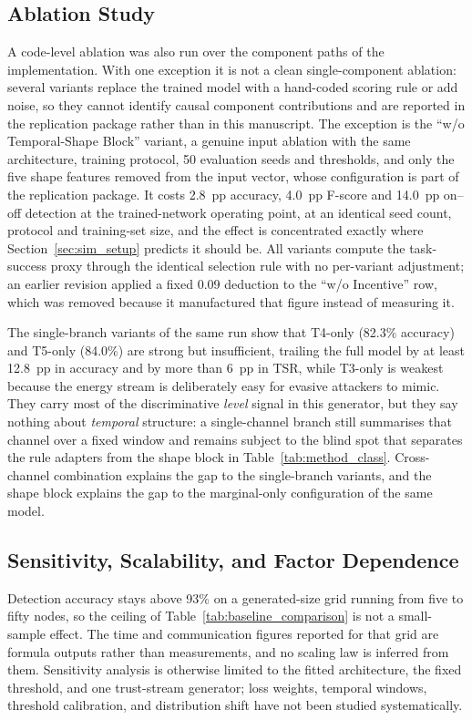 \documentclass[notspecified,article,submit,moreauthors]{Definitions/mdpi}
\begin{document}
\subsection{Ablation Study}
\label{sec:ablation}
A code-level ablation was also run over the component paths of the implementation. With one exception it is not a clean single-component ablation: several variants replace the trained model with a hand-coded scoring rule or add noise, so they cannot identify causal component contributions and are reported in the replication package rather than in this manuscript. The exception is the ``w/o Temporal-Shape Block'' variant, a genuine input ablation with the same architecture, training protocol, 50 evaluation seeds and thresholds, and only the five shape features removed from the input vector, whose configuration is part of the replication package. It costs 2.8~pp accuracy, 4.0~pp F-score and 14.0~pp on--off detection at the trained-network operating point, at an identical seed count, protocol and training-set size, and the effect is concentrated exactly where Section~\ref{sec:sim_setup} predicts it should be. All variants compute the task-success proxy through the identical selection rule with no per-variant adjustment; an earlier revision applied a fixed 0.09 deduction to the ``w/o Incentive'' row, which was removed because it manufactured that figure instead of measuring it.

The single-branch variants of the same run show that T4-only (82.3\% accuracy) and T5-only (84.0\%) are strong but insufficient, trailing the full model by at least 12.8~pp in accuracy and by more than 6~pp in TSR, while T3-only is weakest because the energy stream is deliberately easy for evasive attackers to mimic. They carry most of the discriminative \emph{level} signal in this generator, but they say nothing about \emph{temporal} structure: a single-channel branch still summarises that channel over a fixed window and remains subject to the blind spot that separates the rule adapters from the shape block in Table~\ref{tab:method_class}. Cross-channel combination explains the gap to the single-branch variants, and the shape block explains the gap to the marginal-only configuration of the same model.


\subsection{Sensitivity, Scalability, and Factor Dependence}
Detection accuracy stays above 93\% on a generated-size grid running from five to fifty nodes, so the ceiling of Table~\ref{tab:baseline_comparison} is not a small-sample effect. The time and communication figures reported for that grid are formula outputs rather than measurements, and no scaling law is inferred from them. Sensitivity analysis is otherwise limited to the fitted architecture, the fixed threshold, and one trust-stream generator; loss weights, temporal windows, threshold calibration, and distribution shift have not been studied systematically.
\end{document}
